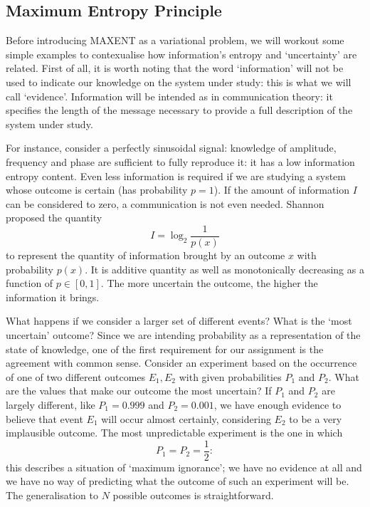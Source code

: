 \documentclass[twocolumn,showpacs,preprintnumbers,nofootinbib,prd,
superscriptaddress,10pt]{revtex4-1}
\begin{document}
\subsection{Maximum Entropy Principle} \label{sec:MAXENT}

Before introducing MAXENT as a variational problem, we will workout some simple examples to contexualise how information's entropy
and `uncertainty' are related. First of all,  it is worth noting that the word `information' will not be used to indicate our knowledge on the system under study: this is what we will call `evidence'. Information will be intended as in communication theory: it specifies the length of the message necessary to provide
a full description of the system under study.

For instance, consider a perfectly sinusoidal signal: knowledge of amplitude, frequency and phase are sufficient to fully reproduce it: 
it has a low information entropy content. Even less information is required if we are studying a system whose outcome is 
certain (has probability $p = 1$). If the amount of information $I$ can be considered to zero, a communication is not even needed.  
Shannon \cite{Shannon} proposed the quantity
\begin{equation}\label{eq:information}
    I = \log_2 \frac{1}{p(x)}
\end{equation}
to represent the quantity of information brought by an outcome $x$ with probability $p(x)$. It is additive quantity as well as monotonically decreasing as a function of $p \in [0, 1]$. The more uncertain the outcome, the higher the information it brings.
\par
What happens if we consider a larger set of different events? What is  the `most uncertain' outcome?  Since we are intending probability as a representation of the state of knowledge, one of the first requirement for our assignment is the agreement with common sense.
Consider an experiment based on the occurrence of one of two different outcomes $E_1, E_2$ with given probabilities $P_1$ and $P_2$. What are the values that make our outcome the most uncertain?
If $P_1$ and $P_2$ are largely different, like $P_1 = 0.999$ and $P_2 = 0.001$, we have enough evidence to believe that event $E_1$ will occur almost certainly, considering $E_2$ to be a very implausible outcome.
The most unpredictable experiment is the one in which 
\begin{equation}\nonumber
    P_1 = P_2 = \frac{1}{2}:
\end{equation}
this describes a situation of `maximum ignorance'; we have no evidence at all and we have no way of predicting what the outcome of such an experiment will be.  The generalisation to $N$ possible outcomes is straightforward. \\ 
\end{document}
